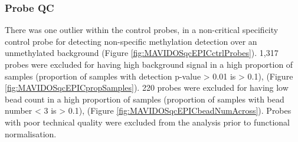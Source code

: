 \documentclass[
]{book}
\begin{document}
\hypertarget{probe-qc-1}{%
\subsubsection{Probe QC}\label{probe-qc-1}}

There was one outlier within the control probes, in a non-critical specificity control probe for detecting non-specific methylation detection over an unmethylated background (Figure \ref{fig:MAVIDOSqcEPICctrlProbes}).
1,317 probes were excluded for having high background signal in a high proportion of samples (proportion of samples with detection p-value \textgreater{} 0.01 is \textgreater{} 0.1), (Figure \ref{fig:MAVIDOSqcEPICpropSamples}).
220 probes were excluded for having low bead count in a high proportion of samples (proportion of samples with bead number \textless{} 3 is \textgreater{} 0.1), (Figure \ref{fig:MAVIDOSqcEPICbeadNumAcross}).
Probes with poor technical quality were excluded from the analysis prior to functional normalisation.
\end{document}
